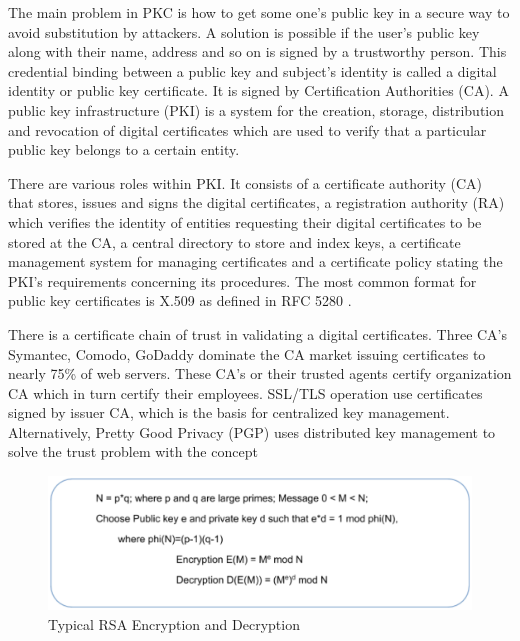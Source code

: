 \begin{multicols}{2}
The main problem in PKC is how to get some one's public key in a secure way to avoid substitution by attackers. A solution is possible if the user's public key along with their name, address and so on is signed by a trustworthy person. This credential binding between a public key and subject's identity is called a digital identity or public key certificate. It is signed by Certification Authorities (CA). A public key infrastructure (PKI) is a system for the creation, storage, distribution and revocation of digital certificates which are used to verify that a particular public key belongs to a certain entity. 

There are various roles within PKI. It consists of a certificate authority (CA) that stores, issues and signs the digital certificates, a registration authority (RA) which verifies the identity of entities requesting their digital certificates to be stored at the CA, a central directory to store and index keys, a certificate management system for managing certificates and a certificate policy stating the PKI's requirements concerning its procedures. The most common format for public key certificates is X.509 as defined in RFC 5280 \cite{chap2-key15}.

{\parfillskip=0pt
There is a certificate chain of trust in validating a digital certificates. Three CA's Symantec, Comodo, GoDaddy dominate the CA market issuing certificates to nearly 75\% of web servers. These CA's or their trusted agents certify organization CA which in turn certify their employees. SSL/TLS operation use certificates signed by issuer CA, which is the basis for centralized key management. Alternatively, Pretty Good Privacy (PGP) uses distributed key management to solve the trust problem with the concept\par}
\end{multicols}


\begin{figure}[!ht]
\centering
\includegraphics[scale=.9]{src/Figures/chap2/4.eps}
\caption{Typical RSA Encryption and Decryption}\label{chap2-fig4}
\end{figure}

